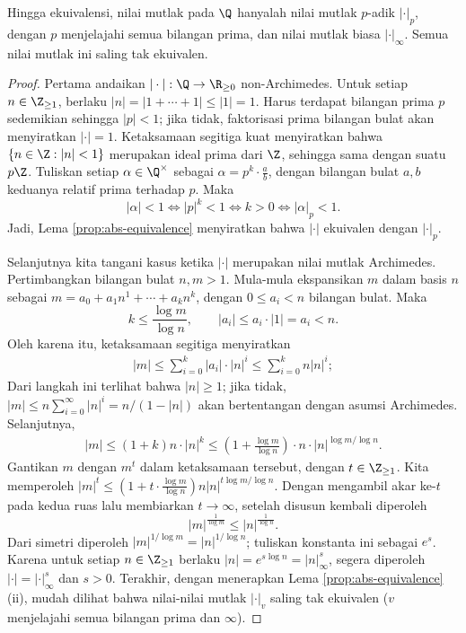 \begin{theorem}[A.\ Ostrowski]\label{prop:abs-Q}
	Hingga ekuivalensi, nilai mutlak pada $\Q$ hanyalah nilai mutlak $p$-adik $|\cdot|_p$, dengan $p$ menjelajahi semua bilangan prima, dan nilai mutlak biasa $|\cdot|_\infty$. Semua nilai mutlak ini saling tak ekuivalen.
\end{theorem}
\begin{proof}
	Pertama andaikan $|\cdot|: \Q \to \R_{\geq 0}$ non-Archimedes. Untuk setiap $n \in \Z_{\geq 1}$, berlaku $|n| = |1 + \cdots + 1| \leq |1|=1$. Harus terdapat bilangan prima $p$ sedemikian sehingga $|p|<1$; jika tidak, faktorisasi prima bilangan bulat akan menyiratkan $|\cdot|=1$. Ketaksamaan segitiga kuat menyiratkan bahwa $\{n \in \Z: |n| < 1 \}$ merupakan ideal prima dari $\Z$, sehingga sama dengan suatu $p\Z$. Tuliskan setiap $\alpha \in \Q^\times$ sebagai $\alpha = p^k \cdot \frac{a}{b}$, dengan bilangan bulat $a, b$ keduanya relatif prima terhadap $p$. Maka
	\[ |\alpha| < 1 \iff |p|^k < 1 \iff k > 0 \iff |\alpha|_p < 1.\]
	Jadi, Lema \ref{prop:abs-equivalence} menyiratkan bahwa $|\cdot|$ ekuivalen dengan $|\cdot|_p$.
	
	Selanjutnya kita tangani kasus ketika $|\cdot|$ merupakan nilai mutlak Archimedes. Pertimbangkan bilangan bulat $n, m > 1$. Mula-mula ekspansikan $m$ dalam basis $n$ sebagai $m = a_0 + a_1 n^1 + \cdots + a_k n^k$, dengan $0 \leq a_i < n$ bilangan bulat. Maka
	\[ k \leq \frac{\log m}{\log n}, \qquad |a_i| \leq a_i \cdot |1| = a_i < n. \]
	Oleh karena itu, ketaksamaan segitiga menyiratkan
	\begin{gather*}
		|m| \leq \sum_{i=0}^k |a_i| \cdot |n|^i \leq \sum_{i=0}^k n |n|^i;
	\end{gather*}
	Dari langkah ini terlihat bahwa $|n| \geq 1$; jika tidak, $|m| \leq n \sum_{i=0}^\infty |n|^i = n/(1-|n|)$ akan bertentangan dengan asumsi Archimedes. Selanjutnya,
	\begin{gather*}
		|m| \leq (1+k) n \cdot |n|^k \leq \left( 1 + \frac{\log m}{\log n} \right) \cdot n \cdot |n|^{\log m/\log n}.
	\end{gather*}
	Gantikan $m$ dengan $m^t$ dalam ketaksamaan tersebut, dengan $t \in \Z_{\geq 1}$. Kita memperoleh $|m|^t \leq \left( 1 + t \cdot \frac{\log m}{\log n} \right) n |n|^{t \log m/\log n}$. Dengan mengambil akar ke-$t$ pada kedua ruas lalu membiarkan $t \to \infty$, setelah disusun kembali diperoleh
	\[ |m|^{\frac{1}{\log m}} \leq |n|^{\frac{1}{\log n}}. \]
	Dari simetri diperoleh $|m|^{1/\log m} = |n|^{1/\log n}$; tuliskan konstanta ini sebagai $e^s$. Karena untuk setiap $n \in \Z_{\geq 1}$ berlaku $|n|=e^{s \log n} = |n|_\infty^s$, segera diperoleh $|\cdot| = |\cdot|_\infty^s$ dan $s > 0$. Terakhir, dengan menerapkan Lema \ref{prop:abs-equivalence} (ii), mudah dilihat bahwa nilai-nilai mutlak $|\cdot|_v$ saling tak ekuivalen ($v$ menjelajahi semua bilangan prima dan $\infty$).
\end{proof}

